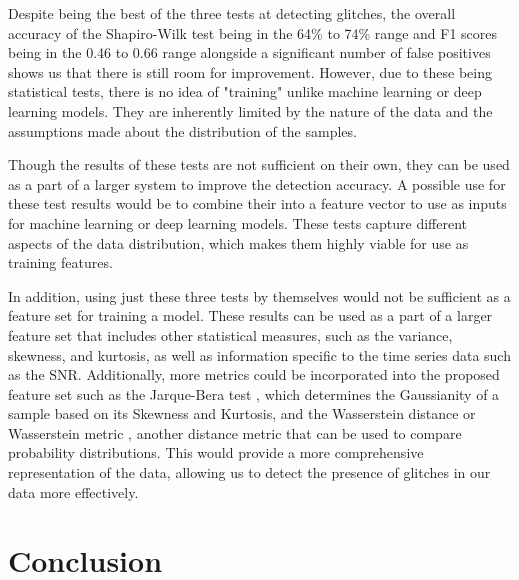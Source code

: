 \documentclass[12pt]{article}
\begin{document}
\medskip
\noindent Despite being the best of the three tests at detecting glitches, the overall accuracy of the Shapiro-Wilk test being in the 64\% to 74\% range and F1 scores being in the 0.46 to 0.66 range alongside a significant number of false positives shows us that there is still room for improvement. However, due to these being statistical tests, there is no idea of "training" unlike machine learning or deep learning models. They are inherently limited by the nature of the data and the assumptions made about the distribution of the samples.

\medskip
\noindent Though the results of these tests are not sufficient on their own, they can be used as a part of a larger system to improve the detection accuracy. A possible use for these test results would be to combine their into a feature vector to use as inputs for machine learning or deep learning models. These tests capture different aspects of the data distribution, which makes them highly viable for use as training features.

\medskip
\noindent In addition, using just these three tests by themselves would not be sufficient as a feature set for training a model. These results can be used as a part of a larger feature set that includes other statistical measures, such as the variance, skewness, and kurtosis, as well as information specific to the time series data such as the SNR. Additionally, more metrics could be incorporated into the proposed feature set such as the Jarque-Bera test \cite{JarqueBera1987}, which determines the Gaussianity of a sample based on its Skewness and Kurtosis, and the Wasserstein distance or Wasserstein metric \cite{Panaretos_2019}, another distance metric that can be used to compare probability distributions. This would provide a more comprehensive representation of the data, allowing us to detect the presence of glitches in our data more effectively.


\section{Conclusion}\label{Conclusions}





\end{document}
